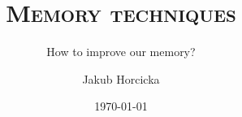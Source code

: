 \documentclass[xcolor=dvipsnames]{beamer}
\author{Jakub Horcicka}
\title{\textsc{Memory techniques}}
\subtitle{How to improve our memory?}
\date{\today}
\begin{document}
 
  \begin{frame}
    \titlepage
  \end{frame}

  
  
  
  
  
\end{document}
